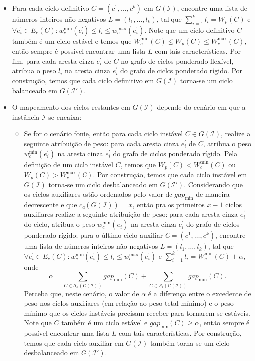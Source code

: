\begin{itemize}
  \item Para cada ciclo definitivo $C=(c^1,\dots,c^k)$ em $G(\mathcal{I})$, encontre uma lista de números inteiros não negativos $L=(l_1,\dots,l_k)$, tal que $\sum_{i=1}^{k}l_i = W_p(C)$ e $\forall e^{\prime}_i \in E_c(C): w^{\min}_c(e^{\prime}_i) \le l_i \le w^{\max}_c(e^{\prime}_i)$. Note que um ciclo definitivo $C$ também é um ciclo estável e temos que $W^{\min}_c(C) \le W_p(C) \le W^{\max}_c(C)$, então sempre é possível encontrar uma lista $L$ com tais características. Por fim, para cada aresta cinza $e^{\prime}_i$ de $C$ no grafo de ciclos ponderado flexível, atribua o peso $l_i$ na aresta cinza $e^{\prime}_i$ do grafo de ciclos ponderado rígido. Por construção, temos que cada ciclo definitivo em $G(\mathcal{I})$ torna-se um ciclo balanceado em $G(\mathcal{I}')$.
  \item O mapeamento dos ciclos restantes em $G(\mathcal{I})$ depende do cenário em que a instância $\mathcal{I}$ se encaixa: 

  \begin{itemize}
    \item Se for o cenário fonte, então para cada ciclo instável $C \in G(\mathcal{I})$, realize a seguinte atribuição de peso: para cada aresta cinza $e^{\prime}_i$ de $C$, atribua o peso $w^{\min}_c(e^{\prime}_i)$ na aresta cinza $e^{\prime}_i$ do grafo de ciclos ponderado rígido. Pela definição de um ciclo instável $C$, temos que $W_p(C)  < W^{\min}_c(C)$ ou $W_p(C) > W^{\max}_c(C)$. Por construção, temos que cada ciclo instável em $G(\mathcal{I})$ torna-se um ciclo desbalanceado em $G(\mathcal{I}')$. Considerando que os ciclos auxiliares estão ordenados pelo valor de $gap_{\min}$ de maneira decrescente e que $c_a(G(\mathcal{I})) = x$, então pra os primeiros $x-1$ ciclos auxiliares realize a seguinte atribuição de peso: para cada aresta cinza $e^{\prime}_i$ do ciclo, atribua o peso $w^{\min}_c(e^{\prime}_i)$ na aresta cinza $e^{\prime}_i$ do grafo de ciclos ponderado rígido; para o último ciclo auxiliar $C=(c^1,\dots,c^k)$, encontre uma lista de números inteiros não negativos $L=(l_1,\dots,l_k)$, tal que $\forall e^{\prime}_i \in E_c(C): w^{\min}_c(e^{\prime}_i) \le l_i \le w^{\max}_c(e^{\prime}_i)$ e $\sum_{i=1}^{k}l_i = W^{\min}_c(C) + \alpha$, onde 
    $$\alpha = \sum_{C \in \mathcal{S}_a(G(\mathcal{I}))} gap_{\min}(C) + \sum_{C \in \mathcal{S}_i(G(\mathcal{I}))} gap_{\min}(C).$$ 
    Perceba que, neste cenário, o valor de $\alpha$ é a diferença entre o excedente de peso nos ciclos auxiliares (em relação ao peso total mínimo) e o peso mínimo que os ciclos instáveis precisam receber para tornarem-se estáveis. Note que $C$ também é um ciclo estável e $gap_{\min}(C) \ge \alpha$, então sempre é possível encontrar uma lista $L$ com tais características. Por construção, temos que cada ciclo auxiliar em $G(\mathcal{I})$ também torna-se um ciclo desbalanceado em $G(\mathcal{I}')$.


\end{itemize}
\end{itemize}
